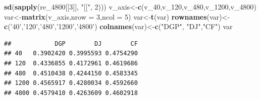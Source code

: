 \documentclass[
]{article}
\newenvironment{Shaded}{\begin{snugshade}}{\end{snugshade}}
\newcommand{\DataTypeTok}[1]{\textcolor[rgb]{0.13,0.29,0.53}{#1}}
\newcommand{\DecValTok}[1]{\textcolor[rgb]{0.00,0.00,0.81}{#1}}
\newcommand{\KeywordTok}[1]{\textcolor[rgb]{0.13,0.29,0.53}{\textbf{#1}}}
\newcommand{\NormalTok}[1]{#1}
\newcommand{\StringTok}[1]{\textcolor[rgb]{0.31,0.60,0.02}{#1}}
\begin{document}
\begin{Shaded}
\begin{Highlighting}[]
        \KeywordTok{sd}\NormalTok{(}\KeywordTok{sapply}\NormalTok{(re_}\DecValTok{4800}\NormalTok{[[}\DecValTok{3}\NormalTok{]], }\StringTok{"[["}\NormalTok{, }\DecValTok{2}\NormalTok{)))}
\NormalTok{v_axis<-}\KeywordTok{c}\NormalTok{(v_}\DecValTok{40}\NormalTok{,v_}\DecValTok{120}\NormalTok{,v_}\DecValTok{480}\NormalTok{,v_}\DecValTok{1200}\NormalTok{,v_}\DecValTok{4800}\NormalTok{)}
\NormalTok{var<-}\KeywordTok{matrix}\NormalTok{(v_axis,}\DataTypeTok{nrow =} \DecValTok{3}\NormalTok{,}\DataTypeTok{ncol =} \DecValTok{5}\NormalTok{)}
\NormalTok{var<-}\KeywordTok{t}\NormalTok{(var)}
\KeywordTok{rownames}\NormalTok{(var)<-}\KeywordTok{c}\NormalTok{(}\StringTok{'40'}\NormalTok{,}\StringTok{'120'}\NormalTok{,}\StringTok{'480'}\NormalTok{,}\StringTok{'1200'}\NormalTok{,}\StringTok{'4800'}\NormalTok{)}
\KeywordTok{colnames}\NormalTok{(var)<-}\KeywordTok{c}\NormalTok{(}\StringTok{"DGP"}\NormalTok{, }\StringTok{"DJ"}\NormalTok{,}\StringTok{"CF"}\NormalTok{)}
\NormalTok{var}
\end{Highlighting}
\end{Shaded}

\begin{verbatim}
##            DGP        DJ        CF
## 40   0.3902420 0.3995593 0.4754290
## 120  0.4336855 0.4172961 0.4619686
## 480  0.4510438 0.4244150 0.4583345
## 1200 0.4565917 0.4280034 0.4592660
## 4800 0.4579410 0.4263609 0.4602918
\end{verbatim}
\end{document}
